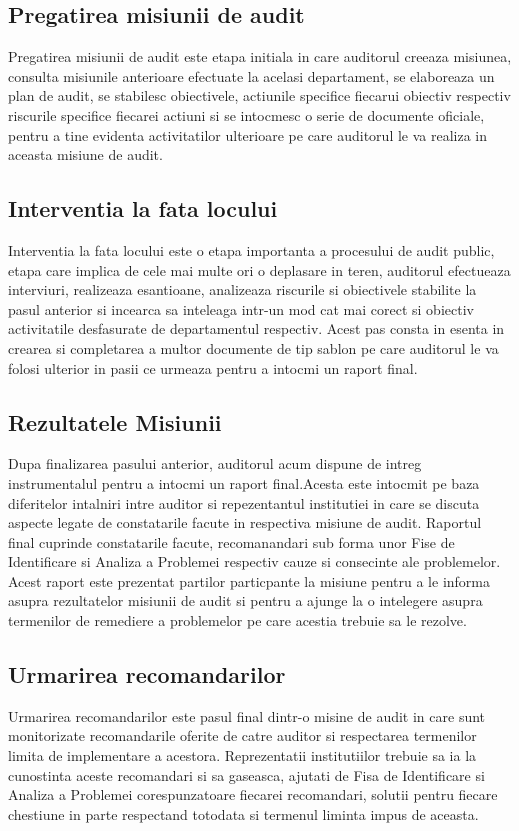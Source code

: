 \subsection*{Pregatirea misiunii de audit}
Pregatirea misiunii de audit este etapa initiala in care auditorul creeaza misiunea, consulta misiunile anterioare efectuate la acelasi departament, se elaboreaza un plan de audit, se stabilesc obiectivele, actiunile specifice fiecarui obiectiv respectiv riscurile specifice fiecarei actiuni si se intocmesc o serie de documente oficiale, pentru a tine evidenta activitatilor ulterioare pe care auditorul le va realiza in aceasta misiune de audit.

\subsection*{Interventia la fata locului}
Interventia la fata locului este o etapa importanta a procesului de audit public, etapa care implica de cele mai multe ori o deplasare in teren, auditorul efectueaza interviuri, realizeaza esantioane, analizeaza riscurile si obiectivele stabilite la pasul anterior si incearca sa inteleaga intr-un mod cat mai corect si obiectiv activitatile desfasurate de departamentul respectiv. Acest pas consta in esenta in crearea si completarea a multor documente de tip sablon pe care auditorul le va folosi ulterior in pasii ce urmeaza pentru a intocmi un raport final.

\subsection*{Rezultatele Misiunii}
Dupa finalizarea pasului anterior, auditorul acum dispune de intreg instrumentalul pentru a intocmi un raport final.Acesta este intocmit pe baza diferitelor intalniri intre auditor si repezentantul institutiei in care se discuta aspecte legate de constatarile facute in respectiva misiune de audit. Raportul final cuprinde constatarile facute, recomanandari sub forma 
unor Fise de Identificare si Analiza a Problemei respectiv cauze si consecinte ale problemelor.\\
Acest raport este prezentat partilor particpante la misiune pentru a le informa asupra rezultatelor misiunii de audit si pentru a ajunge la o intelegere asupra termenilor de remediere a problemelor pe care acestia trebuie sa le rezolve.

\subsection*{Urmarirea recomandarilor}
Urmarirea recomandarilor este pasul final dintr-o misine de audit in care sunt monitorizate recomandarile oferite de catre auditor si respectarea termenilor limita de implementare a acestora. Reprezentatii institutiilor trebuie sa ia la cunostinta aceste recomandari si sa gaseasca, ajutati de Fisa de Identificare si Analiza a Problemei corespunzatoare fiecarei recomandari, solutii pentru fiecare chestiune in parte respectand totodata si termenul liminta impus de aceasta.


